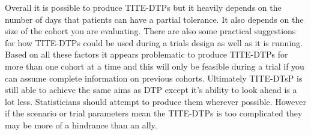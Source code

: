Overall it is possible to produce TITE-DTPs but it heavily depends on the number of days that patients can have a partial tolerance. It also depends on the size of the cohort you are evaluating. There are also some practical suggestions for how TITE-DTPs could be used during a trials design as well as it is running. Based on all these factors it appears problematic to produce TITE-DTPs for more than one cohort at a time and this will only be feasible during a trial if you can assume complete information on previous cohorts. Ultimately TITE-DTsP is still able to achieve the same aims as DTP except it's ability to look ahead is a lot less. Statisticians should attempt to produce them wherever possible. However if the scenario or trial parameters mean the TITE-DTPs is too complicated they may be more of a hindrance than an ally.










































